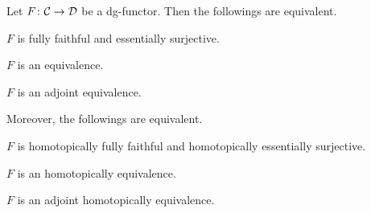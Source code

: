 \begin{proposition}\label{prop:equiv_of_dg_cats}
Let $F\colon{\cal C}\to{\cal D}$ be a dg-functor. 
Then the followings are equivalent.
\begin{proplist}
\item 
$F$ is fully faithful and essentially surjective.
\item 
$F$ is an equivalence.
\item 
$F$ is an adjoint equivalence.
\end{proplist}
Moreover, the followings are equivalent.
\begin{proplist}[resume]
\item 
$F$ is homotopically fully faithful and 
homotopically essentially surjective.
\item 
$F$ is an homotopically equivalence.
\item 
$F$ is an adjoint homotopically equivalence.
\end{proplist}
\end{proposition}
